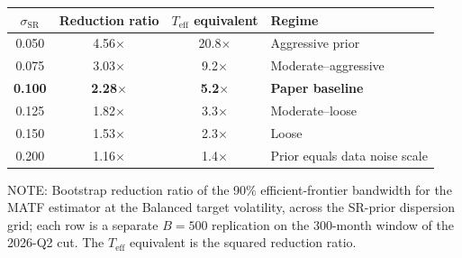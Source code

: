 \documentclass[pdftex,12pt,a4paper]{article}
\begin{document}
\begin{table}[H]
	\label{tab:sr_sensitivity}\vspace*{-1.0\baselineskip}
	\begin{center}
		\small
		\begin{tabular}{cccl}
			\toprule
			$\sigma_{\mathrm{SR}}$ & Reduction ratio & $T_{\mathrm{eff}}$ equivalent & Regime \\
			\midrule
			0.050 & 4.56$\times$  & 20.8$\times$ & Aggressive prior \\
			0.075 & 3.03$\times$  & 9.2$\times$ & Moderate--aggressive \\
			\textbf{0.100} & \textbf{2.28$\times$}  & \textbf{5.2$\times$} & \textbf{Paper baseline} \\
			0.125 & 1.82$\times$  & 3.3$\times$ & Moderate--loose \\
			0.150 & 1.53$\times$  & 2.3$\times$ & Loose \\
			0.200 & 1.16$\times$  & 1.4$\times$ & Prior equals data noise scale \\
			\bottomrule
		\end{tabular}
	\end{center}\vspace*{-0.75\baselineskip}
	\small
	NOTE: Bootstrap reduction ratio of the 90\% efficient-frontier bandwidth for the MATF estimator at the Balanced target volatility, across the SR-prior dispersion grid; each row is a separate $B = 500$ replication on the $300$-month window of the 2026-Q2 cut. The $T_{\mathrm{eff}}$ equivalent is the squared reduction ratio.
\end{table}\vspace*{-0.75\baselineskip}
\end{document}
